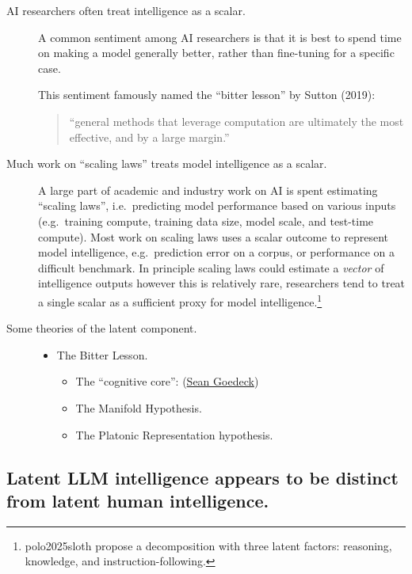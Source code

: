 \documentclass[
  letterpaper,
  DIV=11,
  numbers=noendperiod,
  oneside]{scrartcl}
\providecommand{\tightlist}{%
  \setlength{\itemsep}{0pt}\setlength{\parskip}{0pt}}
\begin{document}
\begin{description}
\item[AI researchers often treat intelligence as a scalar.]
A common sentiment among AI researchers is that it is best to spend time
on making a model generally better, rather than fine-tuning for a
specific case.

This sentiment famously named the ``bitter lesson'' by Sutton (2019):

\begin{quote}
``general methods that leverage computation are ultimately the most
effective, and by a large margin.''
\end{quote}
\item[Much work on ``scaling laws'' treats model intelligence as a
scalar.]
A large part of academic and industry work on AI is spent estimating
``scaling laws'', i.e.~predicting model performance based on various
inputs (e.g.~training compute, training data size, model scale, and
test-time compute). Most work on scaling laws uses a scalar outcome to
represent model intelligence, e.g.~prediction error on a corpus, or
performance on a difficult benchmark. In principle scaling laws could
estimate a \emph{vector} of intelligence outputs however this is
relatively rare, researchers tend to treat a single scalar as a
sufficient proxy for model intelligence.\footnote{polo2025sloth propose
  a decomposition with three latent factors: reasoning, knowledge, and
  instruction-following.}
\item[Some theories of the latent component.]
\hfill
\begin{itemize}
\tightlist
\item
  The Bitter Lesson.

  \hfill
  \begin{itemize}
  \tightlist
  \item
    The ``cognitive core'':
    (\href{https://www.seangoedecke.com/cognitive-core/\#fn-1}{Sean
    Goedeck})
  \item
    The Manifold Hypothesis.
  \item
    The Platonic Representation hypothesis.
  \end{itemize}
\end{itemize}
\end{description}

\hfill\break

\subsection{Latent LLM intelligence appears to be distinct from latent
human
intelligence.}\label{latent-llm-intelligence-appears-to-be-distinct-from-latent-human-intelligence.}
\end{document}
